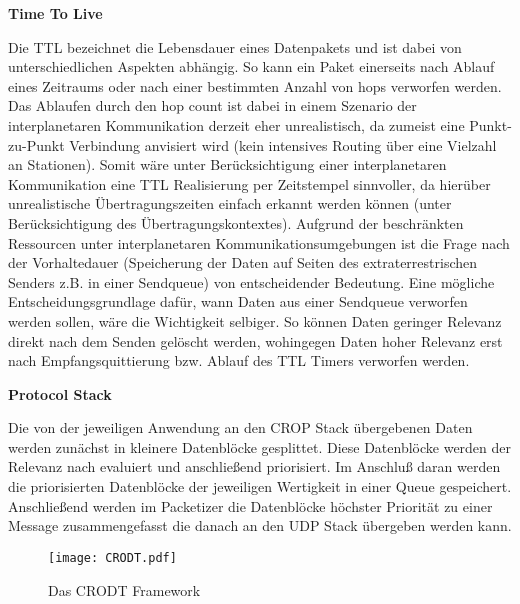 \label{sec:Vorueberlegung}

\textbf{Time To Live}

Die TTL bezeichnet die Lebensdauer eines Datenpakets und ist dabei von
unterschiedlichen Aspekten abh{\"a}ngig. So kann ein Paket einerseits nach
Ablauf eines Zeitraums oder nach einer bestimmten Anzahl
von hops verworfen werden. Das Ablaufen durch den hop  count ist dabei in einem Szenario der interplanetaren Kommunikation derzeit
eher unrealistisch, da zumeist eine Punkt-zu-Punkt Verbindung anvisiert
wird (kein intensives Routing {\"u}ber eine Vielzahl an Stationen). Somit w{\"a}re unter Ber{\"u}cksichtigung einer
interplanetaren Kommunikation eine TTL Realisierung per Zeitstempel
sinnvoller, da hier{\"u}ber unrealistische {\"U}bertragungszeiten einfach
erkannt werden k{\"o}nnen (unter Ber{\"u}cksichtigung des {\"U}bertragungskontextes).
Aufgrund der beschr{\"a}nkten Ressourcen unter interplanetaren
Kommunikationsumgebungen ist die Frage nach der Vorhaltedauer (Speicherung der
Daten auf Seiten des extraterrestrischen Senders z.B. in einer Sendqueue) von
entscheidender Bedeutung.
Eine m{\"o}gliche Entscheidungsgrundlage daf{\"u}r, wann Daten aus einer
Sendqueue verworfen werden sollen, w{\"a}re die Wichtigkeit selbiger. So
k{\"o}nnen Daten geringer Relevanz direkt nach dem Senden gel{\"o}scht werden,
wohingegen Daten hoher Relevanz erst nach Empfangsquittierung bzw. Ablauf des
TTL Timers verworfen werden.

\newpage %
\textbf{Protocol Stack}

Die von der jeweiligen Anwendung an den CROP Stack {\"u}bergebenen Daten werden
zun{\"a}chst in kleinere Datenbl{\"o}cke gesplittet. Diese Datenbl{\"o}cke
werden der Relevanz nach evaluiert und anschlie{\ss}end priorisiert.
Im Anschlu{\ss} daran werden die priorisierten Datenbl{\"o}cke der jeweiligen
Wertigkeit in einer Queue gespeichert. Anschlie{\ss}end werden im
Packetizer die Datenbl{\"o}cke h{\"o}chster Priorit{\"a}t zu einer Message zusammengefasst
die danach an den UDP Stack {\"u}bergeben werden kann.

\begin{figure}[H]
\centering
\texttt{[image: CRODT.pdf]}
\caption{Das CRODT Framework}
\label{fig:CRODT}
\end{figure}

